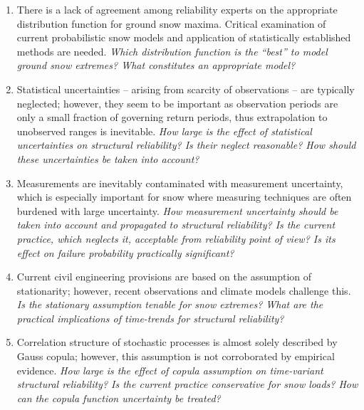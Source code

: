 \begin{enumerate}
	\item There is a lack of agreement among reliability experts on the appropriate distribution function for ground snow maxima. Critical examination of current probabilistic snow models and application of statistically established methods are needed. \textit{Which distribution function is the ``best'' to model ground snow extremes? What constitutes an appropriate model?}
	
	\item Statistical uncertainties -- arising from scarcity of observations -- are typically neglected; however, they seem to be important as observation periods are only a small fraction of governing return periods, thus extrapolation to unobserved ranges is inevitable. \textit{How large is the effect of statistical uncertainties on structural reliability? Is their neglect reasonable? How should these uncertainties be taken into account?}
	
	\item Measurements are inevitably contaminated with measurement uncertainty, which is especially important for snow where measuring techniques are often burdened with large uncertainty. \textit{How measurement uncertainty should be taken into account and propagated to structural reliability? Is the current practice, which neglects it, acceptable from reliability point of view? Is its effect on failure probability practically significant?}
	
	\item Current civil engineering provisions are based on the assumption of stationarity; however, recent observations and climate models challenge this. \textit{Is the stationary assumption tenable for snow extremes? What are the practical implications of time-trends for structural reliability?}
	
	
	\item Correlation structure of stochastic processes is almost solely described by Gauss copula; however, this assumption is not corroborated by empirical evidence. \textit{How large is the effect of copula assumption on time-variant structural reliability? Is the current practice conservative for snow loads? How can the copula function uncertainty be treated?}		
\end{enumerate}

